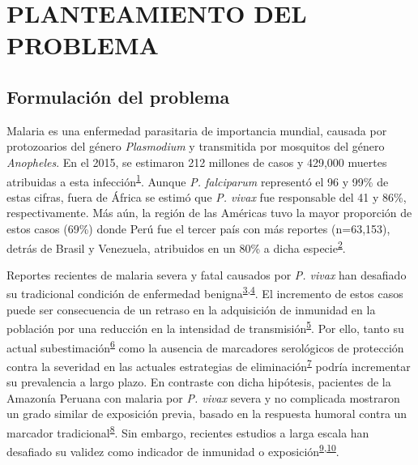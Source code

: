 \documentclass[a4paper]{article}
\begin{document}
\section{PLANTEAMIENTO DEL PROBLEMA}\label{planteamiento-del-problema}

\subsection{Formulación del problema}\label{intro}

Malaria es una enfermedad parasitaria de importancia mundial, causada
por protozoarios del género \emph{Plasmodium} y transmitida por
mosquitos del género \emph{Anopheles}. En el 2015, se estimaron 212
millones de casos y 429,000 muertes atribuidas a esta
infección\textsuperscript{\protect\hyperlink{ref-WHO2016world}{1}}.
Aunque \emph{P. falciparum} representó el 96 y 99\% de estas cifras,
fuera de África se estimó que \emph{P. vivax} fue responsable del 41 y
86\%, respectivamente. Más aún, la región de las Américas tuvo la mayor
proporción de estos casos (69\%) donde Perú fue el tercer país con más
reportes (n=63,153), detrás de Brasil y Venezuela, atribuidos en un 80\%
a dicha
especie\textsuperscript{\protect\hyperlink{ref-rosas2016peru}{2}}.

Reportes recientes de malaria severa y fatal causados por \emph{P.
vivax} han desafiado su tradicional condición de enfermedad
benigna\textsuperscript{\protect\hyperlink{ref-baird2009}{3},\protect\hyperlink{ref-quispe2014}{4}}.
El incremento de estos casos puede ser consecuencia de un retraso en la
adquisición de inmunidad en la población por una reducción en la
intensidad de
transmisión\textsuperscript{\protect\hyperlink{ref-reyburn2015}{5}}. Por
ello, tanto su actual
subestimación\textsuperscript{\protect\hyperlink{ref-norma2001}{6}} como
la ausencia de marcadores serológicos de protección contra la severidad
en las actuales estrategias de
eliminación\textsuperscript{\protect\hyperlink{ref-accelerate2016}{7}}
podría incrementar su prevalencia a largo plazo. En contraste con dicha
hipótesis, pacientes de la Amazonía Peruana con malaria por \emph{P.
vivax} severa y no complicada mostraron un grado similar de exposición
previa, basado en la respuesta humoral contra un marcador
tradicional\textsuperscript{\protect\hyperlink{ref-baldevi2013}{8}}. Sin
embargo, recientes estudios a larga escala han desafiado su validez como
indicador de inmunidad o
exposición\textsuperscript{\protect\hyperlink{ref-crompton2010}{9},\protect\hyperlink{ref-Helb2015exposure}{10}}.
\end{document}
